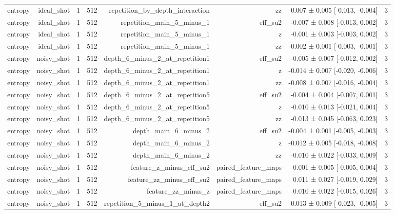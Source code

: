 \begin{table}
\begin{tabular}{lrrrrrrr}
entropy & ideal\_shot & 1 & 512 & repetition\_by\_depth\_interaction & zz & -0.007 ± 0.005 [-0.013, -0.004] & 3 \\
entropy & ideal\_shot & 1 & 512 & repetition\_main\_5\_minus\_1 & eff\_su2 & -0.007 ± 0.008 [-0.013, 0.002] & 3 \\
entropy & ideal\_shot & 1 & 512 & repetition\_main\_5\_minus\_1 & z & -0.001 ± 0.003 [-0.003, 0.002] & 3 \\
entropy & ideal\_shot & 1 & 512 & repetition\_main\_5\_minus\_1 & zz & -0.002 ± 0.001 [-0.003, -0.001] & 3 \\
entropy & noisy\_shot & 1 & 512 & depth\_6\_minus\_2\_at\_repetition1 & eff\_su2 & -0.005 ± 0.007 [-0.012, 0.002] & 3 \\
entropy & noisy\_shot & 1 & 512 & depth\_6\_minus\_2\_at\_repetition1 & z & -0.014 ± 0.007 [-0.020, -0.006] & 3 \\
entropy & noisy\_shot & 1 & 512 & depth\_6\_minus\_2\_at\_repetition1 & zz & -0.008 ± 0.007 [-0.016, -0.004] & 3 \\
entropy & noisy\_shot & 1 & 512 & depth\_6\_minus\_2\_at\_repetition5 & eff\_su2 & -0.004 ± 0.004 [-0.007, 0.001] & 3 \\
entropy & noisy\_shot & 1 & 512 & depth\_6\_minus\_2\_at\_repetition5 & z & -0.010 ± 0.013 [-0.021, 0.004] & 3 \\
entropy & noisy\_shot & 1 & 512 & depth\_6\_minus\_2\_at\_repetition5 & zz & -0.013 ± 0.045 [-0.063, 0.023] & 3 \\
entropy & noisy\_shot & 1 & 512 & depth\_main\_6\_minus\_2 & eff\_su2 & -0.004 ± 0.001 [-0.005, -0.003] & 3 \\
entropy & noisy\_shot & 1 & 512 & depth\_main\_6\_minus\_2 & z & -0.012 ± 0.005 [-0.018, -0.008] & 3 \\
entropy & noisy\_shot & 1 & 512 & depth\_main\_6\_minus\_2 & zz & -0.010 ± 0.022 [-0.033, 0.009] & 3 \\
entropy & noisy\_shot & 1 & 512 & feature\_z\_minus\_eff\_su2 & paired\_feature\_maps & 0.001 ± 0.005 [-0.005, 0.004] & 3 \\
entropy & noisy\_shot & 1 & 512 & feature\_zz\_minus\_eff\_su2 & paired\_feature\_maps & 0.011 ± 0.027 [-0.019, 0.029] & 3 \\
entropy & noisy\_shot & 1 & 512 & feature\_zz\_minus\_z & paired\_feature\_maps & 0.010 ± 0.022 [-0.015, 0.026] & 3 \\
entropy & noisy\_shot & 1 & 512 & repetition\_5\_minus\_1\_at\_depth2 & eff\_su2 & -0.013 ± 0.009 [-0.023, -0.005] & 3 \\

\end{tabular}
\end{table}
